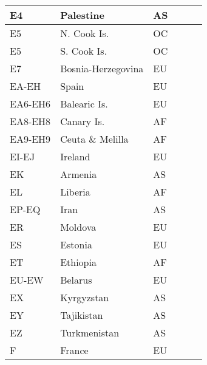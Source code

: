 \documentclass[a4paper]{article}
\begin{document}
\begin{longtable}{|p{1.5cm}|p{4cm}|l|p{2cm}|p{2cm}|p{2cm}|}
\hline
E4                     & Palestine                                  & AS    & & & \\
\hline
E5                     & N. Cook Is.                                & OC    & & & \\
\hline
E5                     & S. Cook Is.                                & OC    & & & \\
\hline
E7                     & Bosnia-Herzegovina                         & EU    & & & \\
\hline
EA-EH                  & Spain                                      & EU    & & & \\
\hline
EA6-EH6                & Balearic Is.                               & EU    & & & \\
\hline
EA8-EH8                & Canary Is.                                 & AF    & & & \\
\hline
EA9-EH9                & Ceuta \& Melilla                           & AF    & & & \\
\hline
EI-EJ                  & Ireland                                    & EU    & & & \\
\hline
EK                     & Armenia                                    & AS    & & & \\
\hline
EL                     & Liberia                                    & AF    & & & \\
\hline
EP-EQ                  & Iran                                       & AS    & & & \\
\hline
ER                     & Moldova                                    & EU    & & & \\
\hline
ES                     & Estonia                                    & EU    & & & \\
\hline
ET                     & Ethiopia                                   & AF    & & & \\
\hline
EU-EW                  & Belarus                                    & EU    & & & \\
\hline
EX                     & Kyrgyzstan                                 & AS    & & & \\
\hline
EY                     & Tajikistan                                 & AS    & & & \\
\hline
EZ                     & Turkmenistan                               & AS    & & & \\
\hline
F                      & France                                     & EU    & & & \\

\end{longtable}
\end{document}
